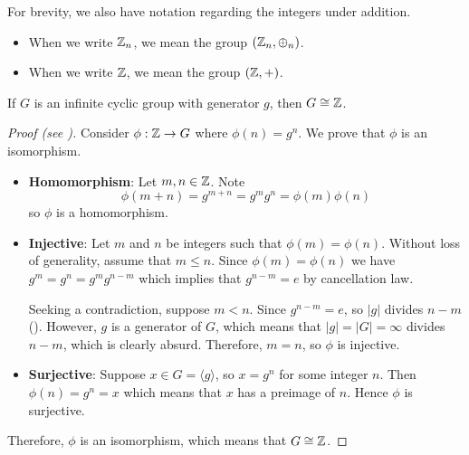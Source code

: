 For brevity, we also have notation regarding the integers under addition.
\begin{itemize}
    \item When we write $\mathbb{Z}_n$, we mean the group $(\mathbb{Z}_n, \oplus_n)$.
    \item When we write $\mathbb{Z}$, we mean the group $(\mathbb{Z}, +)$.
\end{itemize}

\begin{theorem}
    If $G$ is an infinite cyclic group with generator $g$, then $G \cong \mathbb{Z}$.
\end{theorem}
\begin{proof}[Proof (see \cite{proofwiki_infinite-cyclic-group})]
    Consider $\phi: \mathbb{Z} \to G$ where $\phi(n) = g^n$. We prove that $\phi$ is an isomorphism.
    \begin{itemize}
        \item \textbf{Homomorphism}: Let $m, n \in \mathbb{Z}$. Note
        \[
            \phi(m+n) = g^{m+n} = g^mg^n = \phi(m)\phi(n)
        \]
        so $\phi$ is a homomorphism.

        \item \textbf{Injective}: Let $m$ and $n$ be integers such that $\phi(m) = \phi(n)$. Without loss of generality, assume that $m \leq n$. Since $\phi(m) = \phi(n)$ we have $g^m = g^n = g^mg^{n-m}$ which implies that $g^{n-m} = e$ by cancellation law.

        Seeking a contradiction, suppose $m < n$. Since $g^{n-m} = e$, so $|g|$ divides $n-m$ (). However, $g$ is a generator of $G$, which means that $|g| = |G| = \infty$ divides $n-m$, which is clearly absurd. Therefore, $m = n$, so $\phi$ is injective.

        \item \textbf{Surjective}: Suppose $x \in G = \langle g\rangle$, so $x = g^n$ for some integer $n$. Then $\phi(n) = g^n = x$ which means that $x$ has a preimage of $n$. Hence $\phi$ is surjective.
    \end{itemize}

    Therefore, $\phi$ is an isomorphism, which means that $G \cong \mathbb{Z}$.
\end{proof}

